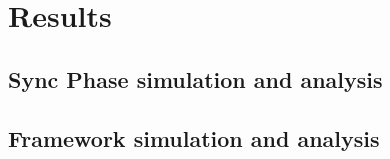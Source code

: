 \chapter{Results}

\section{Sync Phase simulation and analysis}

\section{Framework simulation and analysis}
